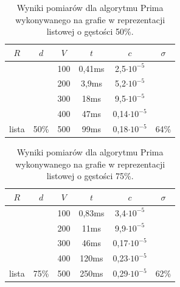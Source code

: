 \documentclass[a4paper,12pt]{article}
\begin{document}
\begin{table}[H]
	\centering
	\caption{\centering Wyniki pomiarów dla algorytmu Prima wykonywanego na grafie w reprezentacji listowej o gęstości 50\%.}
	\begin{tabular}{|c|c|c|c|c|c|}
		\hline
		\rowcolor[HTML]{C0C0C0} 
		$R$                     & $d$                    & $V$ & $t$    & $c$                 & $\sigma$               \\ \hline
		&                        & 100 & 0,41ms & 2,5$\cdot 10^{-5}$  &                        \\ \cline{3-5}
		&                        & 200 & 3,9ms  & 5,2$\cdot 10^{-5}$  &                        \\ \cline{3-5}
		&                        & 300 & 18ms   & 9,5$\cdot 10^{-5}$  &                        \\ \cline{3-5}
		&                        & 400 & 47ms   & 0,14$\cdot 10^{-5}$ &                        \\ \cline{3-5}
		\multirow{-5}{*}{lista} & \multirow{-5}{*}{50\%} & 500 & 99ms   & 0,18$\cdot 10^{-5}$ & \multirow{-5}{*}{64\%} \\ \hline
	\end{tabular}
\end{table}

\begin{table}[H]
	\centering
	\caption{\centering Wyniki pomiarów dla algorytmu Prima wykonywanego na grafie w reprezentacji listowej o gęstości 75\%.}
	\begin{tabular}{|c|c|c|c|c|c|}
		\hline
		\rowcolor[HTML]{C0C0C0} 
		$R$                     & $d$                    & $V$ & $t$    & $c$                 & $\sigma$               \\ \hline
		&                        & 100 & 0,83ms & 3,4$\cdot 10^{-5}$  &                        \\ \cline{3-5}
		&                        & 200 & 11ms   & 9,9$\cdot 10^{-5}$  &                        \\ \cline{3-5}
		&                        & 300 & 46ms   & 0,17$\cdot 10^{-5}$ &                        \\ \cline{3-5}
		&                        & 400 & 120ms  & 0,23$\cdot 10^{-5}$ &                        \\ \cline{3-5}
		\multirow{-5}{*}{lista} & \multirow{-5}{*}{75\%} & 500 & 250ms  & 0,29$\cdot 10^{-5}$ & \multirow{-5}{*}{62\%} \\ \hline
	\end{tabular}
\end{table}
\end{document}
